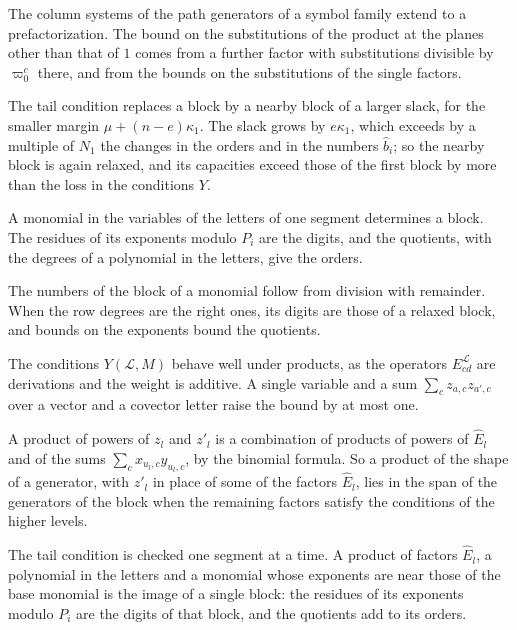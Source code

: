The column systems of the path generators of a symbol family extend to a prefactorization. The bound on the substitutions of
the product at the planes other than that of $1$ comes from a further factor with substitutions divisible by $\varpi_0^c$ there,
and from the bounds on the substitutions of the single factors.

The tail condition replaces a block by a nearby block of a larger slack, for the smaller margin $\mu+(n-e)\kappa_1$. The slack
grows by $e\kappa_1$, which exceeds by a multiple of $N_1$ the changes in the orders and in the numbers $\hat b_i$; so the nearby
block is again relaxed, and its capacities exceed those of the first block by more than the loss in the conditions $Y$.

A monomial in the variables of the letters of one segment determines a block. The residues of its exponents modulo $P_i$
are the digits, and the quotients, with the degrees of a polynomial in the letters, give the orders.

The numbers of the block of a monomial follow from division with remainder. When the row degrees are the right ones, its
digits are those of a relaxed block, and bounds on the exponents bound the quotients.

The conditions $Y(\mathcal L,M)$ behave well under products, as the operators $E^{\mathcal L}_{cd}$ are derivations and the
weight is additive. A single variable and a sum $\sum_cz_{a,c}z_{a',c}$ over a vector and a covector letter raise the bound by
at most one.

A product of powers of $z_l$ and $z'_l$ is a combination of products of powers of $\hat E_l$ and of the sums
$\sum_cx_{u_l,c}y_{u_l,c}$, by the binomial formula. So a product of the shape of a generator, with $z'_l$ in place of some of
the factors $\hat E_l$, lies in the span of the generators of the block when the remaining factors satisfy the conditions of
the higher levels.

The tail condition is checked one segment at a time. A product of factors $\hat E_l$, a polynomial in the letters and a
monomial whose exponents are near those of the base monomial is the image of a single block: the residues of its exponents
modulo $P_i$ are the digits of that block, and the quotients add to its orders.

